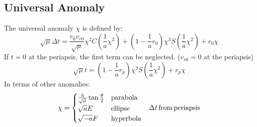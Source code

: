 \subsection{Universal Anomaly}
The universal anomaly $\chi$ is defined by:
\begin{equation}
    \label{universal_anomaly}
    \sqrt{\mu}\Delta{}t =
        \frac{r_{0}v_{r0}}{\sqrt{\mu}}\chi^{2}C\left(\frac{1}{a}\chi^{2}\right) +
        \left(1-\frac{1}{a}r_{0}\right)\chi^{3}S\left(\frac{1}{a}\chi^{2}\right) +
        r_{0}\chi
\end{equation}
If $t = 0$ at the periapsis, the first term can be neglected. ($v_{r0} = 0$ at the periapsis)
\begin{equation}
    \label{universal_anomaly_pe}
    \sqrt{\mu}t =
        \left(1-\frac{1}{a}r_{p}\right)\chi^{3}S\left(\frac{1}{a}\chi^{2}\right) +
        r_{p}\chi
\end{equation}
In terms of other anomalies:
\begin{equation}
    \label{universal_anomaly_relations}
    \begin{array}{c c}
        \chi =
        \begin{cases}
            \frac{h}{\sqrt{\mu}}\tan{\frac{\theta}{2}} & \mathrm{parabola} \\
            \sqrt{a}E & \mathrm{ellipse} \\
            \sqrt{-a}F & \mathrm{hyperbola}
        \end{cases}
        &
        \Delta{}t \mathrm{\,from\,periapsis}
    \end{array}
\end{equation}
